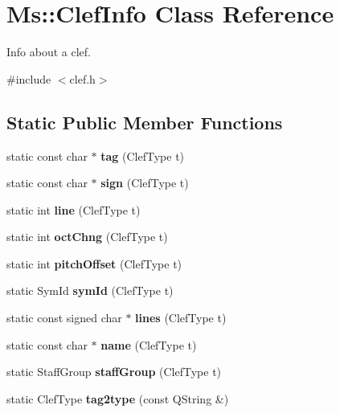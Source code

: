 \hypertarget{class_ms_1_1_clef_info}{}\section{Ms\+:\+:Clef\+Info Class Reference}
\label{class_ms_1_1_clef_info}


Info about a clef.  




{\ttfamily \#include $<$clef.\+h$>$}

\subsection*{Static Public Member Functions}
\begin{DoxyCompactItemize}
\item 
\mbox{\label{class_ms_1_1_clef_info_a82ed8584fb3def6515bd1bc2cacc8f32}} 
static const char $\ast$ {\bfseries tag} (Clef\+Type t)
\item 
\mbox{\label{class_ms_1_1_clef_info_a7018e15128221b1ad952d55f945363c2}} 
static const char $\ast$ {\bfseries sign} (Clef\+Type t)
\item 
\mbox{\label{class_ms_1_1_clef_info_ae745a6776ee384e262fc58b871315f71}} 
static int {\bfseries line} (Clef\+Type t)
\item 
\mbox{\label{class_ms_1_1_clef_info_a3d35a60275c5d8f63a6a76e7eec35474}} 
static int {\bfseries oct\+Chng} (Clef\+Type t)
\item 
\mbox{\label{class_ms_1_1_clef_info_aade8bee0c2d3a7c9e026ddfdf7ebe138}} 
static int {\bfseries pitch\+Offset} (Clef\+Type t)
\item 
\mbox{\label{class_ms_1_1_clef_info_a476400e74781f03cc89cc3f50198a962}} 
static Sym\+Id {\bfseries sym\+Id} (Clef\+Type t)
\item 
\mbox{\label{class_ms_1_1_clef_info_a405d227618c2c073eef62878cf0bbd66}} 
static const signed char $\ast$ {\bfseries lines} (Clef\+Type t)
\item 
\mbox{\label{class_ms_1_1_clef_info_a40d0d9483e06fd191bfef858481d529e}} 
static const char $\ast$ {\bfseries name} (Clef\+Type t)
\item 
\mbox{\label{class_ms_1_1_clef_info_a05d820996638d9b7bd36756ec484e821}} 
static Staff\+Group {\bfseries staff\+Group} (Clef\+Type t)
\item 
\mbox{\label{class_ms_1_1_clef_info_a335ff3380fbb0cf2038f4e7672f357b5}} 
static Clef\+Type {\bfseries tag2type} (const Q\+String \&)
\end{DoxyCompactItemize}

